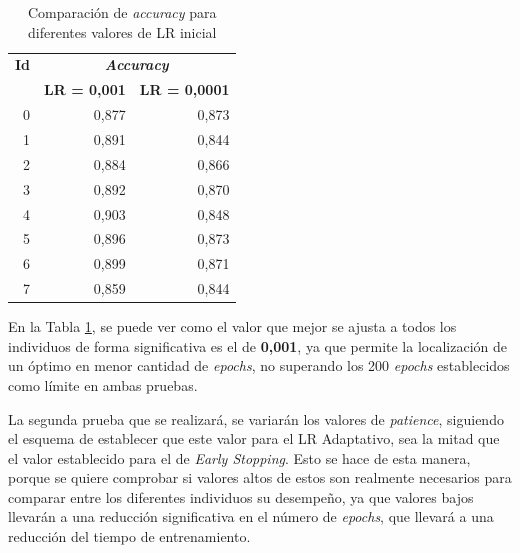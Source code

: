 \begin{table}[h]
\caption{Comparación de \textit{accuracy} para diferentes valores de LR inicial}
\label{tab:lr_inicial}
\centering
\begin{tabular}{r|rr}
\toprule
\multicolumn{1}{c|}{\textbf{Id}} & \multicolumn{2}{c}{\textit{\textbf{Accuracy}}}                                               \\
\multicolumn{1}{c|}{\textbf{}}   & \multicolumn{1}{c|}{\textbf{LR = 0,001}} & \multicolumn{1}{c}{\textbf{LR = 0,0001}} \\ \hline
0                                & \multicolumn{1}{r|}{0,877}               & 0,873                                    \\
1                                & \multicolumn{1}{r|}{0,891}               & 0,844                                    \\
2                                & \multicolumn{1}{r|}{0,884}               & 0,866                                    \\
3                                & \multicolumn{1}{r|}{0,892}               & 0,870                                    \\
4                                & \multicolumn{1}{r|}{0,903}               & 0,848                                    \\
5                                & \multicolumn{1}{r|}{0,896}               & 0,873                                    \\
6                                & \multicolumn{1}{r|}{0,899}               & 0,871                                    \\
7                                & \multicolumn{1}{r|}{0,859}               & 0,844 \\
\bottomrule
\end{tabular}
\end{table}

En la Tabla \ref{tab:lr_inicial}, se puede ver como el valor que mejor se ajusta a todos los individuos de forma significativa es el de \textbf{0,001}, ya que permite la localización de un óptimo en menor cantidad de \textit{epochs}, no superando los 200 \textit{epochs} establecidos como límite en ambas pruebas. 

La segunda prueba que se realizará, se variarán los valores de \textit{patience}, siguiendo el esquema de establecer que este valor para el LR Adaptativo, sea la mitad que el valor establecido para el de \textit{Early Stopping}. Esto se hace de esta manera, porque se quiere comprobar si valores altos de estos son realmente necesarios para comparar entre los diferentes individuos su desempeño, ya que valores bajos llevarán a una reducción significativa en el número de \textit{epochs}, que llevará a una reducción del tiempo de entrenamiento.

